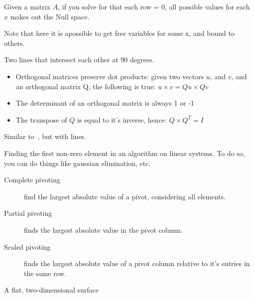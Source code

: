 \begin{definition}
    Given a matrix $A$, if you solve for that each row = 0,
    all possible values for each $x$ makes out the Null space.

    Note that here it is apossible to get free variables for 
    some x, and bound to others.

\end{definition}



\begin{definition}[Orthogonal]\label{orthogonal}
    Two lines that intersect each other at 90 degrees.\\
    \begin{itemize}
        \item Orthogonal matrices preserve dot products:
        given two vectors $u$, and $v$, and an orthogonal matrix Q,
        the following is true:
        $u \times v = Qu \times Qv$
        \item The determinant of an orthogonal matrix is always 1 or -1
        \item The transpose of $Q$ is equal to it's inverse, hence:
            $Q \times Q^{T} = I$
    \end{itemize}
\end{definition}

\begin{definition}[Perpendicular]
    Similar to~, but with lines.
\end{definition}

\begin{definition}[Pivoting]
    Finding the first non-zero element in an algorithm on linear systems.
    To do so, you can do things like gaussian elimination, etc.
    \begin{description}
        \item[Complete pivoting] find the largest absolute value of a pivot,
            considering all elements.
        \item[Partial pivoting] finds the largest absolute value in the pivot
            column.
        \item[Scaled pivoting] finds the largest absolute value of a pivot
            column relative to it's entries in the same row.
    \end{description}
\end{definition}

\begin{definition}[Plane]
    A flat, two-dimensional surface
\end{definition}

